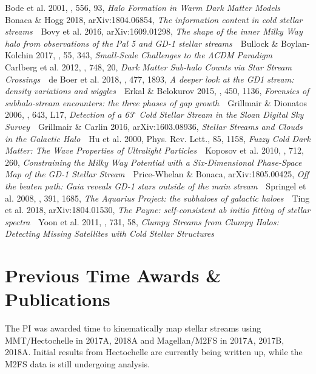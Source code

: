 \documentclass[12pt]{article}
\begin{document}
{Bode et al. 2001, \apj, 556, 93, \emph{Halo Formation in Warm Dark Matter Models} \,\textbullet\,
Bonaca \& Hogg 2018, arXiv:1804.06854, \emph{The information content in cold stellar streams} \,\textbullet\,
Bovy et al. 2016, arXiv:1609.01298, \emph{The shape of the inner Milky Way halo from observations of the Pal 5 and GD-1 stellar streams} \,\textbullet\,
Bullock \& Boylan-Kolchin 2017, \araa, 55, 343, \emph{Small-Scale Challenges to the ΛCDM Paradigm} \,\textbullet\,
Carlberg et al. 2012, \apj, 748, 20, \emph{Dark Matter Sub-halo Counts via Star Stream Crossings} \,\textbullet\,
de Boer et al. 2018, \mnras, 477, 1893, \emph{A deeper look at the GD1 stream: density variations and wiggles} \,\textbullet\,
Erkal \& Belokurov 2015, \mnras, 450, 1136, \emph{Forensics of subhalo-stream encounters: the three phases of gap growth} \,\textbullet\,
Grillmair \& Dionatos 2006, \apj, 643, L17, \emph{Detection of a 63$^\circ$ Cold Stellar Stream in the Sloan Digital Sky Survey} \,\textbullet\,
Grillmair \& Carlin 2016, arXiv:1603.08936, \emph{Stellar Streams and Clouds in the Galactic Halo} \,\textbullet\,
Hu et al. 2000, Phys. Rev. Lett., 85, 1158, \emph{Fuzzy Cold Dark Matter: The Wave Properties of Ultralight Particles} \,\textbullet\,
Koposov et al. 2010, \apj, 712, 260, \emph{Constraining the Milky Way Potential with a Six-Dimensional Phase-Space Map of the GD-1 Stellar Stream} \,\textbullet\,
Price-Whelan \& Bonaca, arXiv:1805.00425, \emph{Off the beaten path: Gaia reveals GD-1 stars outside of the main stream} \,\textbullet\,
Springel et al. 2008, \mnras, 391, 1685, \emph{The Aquarius Project: the subhaloes of galactic haloes} \,\textbullet\,
Ting et al. 2018, arXiv:1804.01530, \emph{The Payne: self-consistent ab initio fitting of stellar spectra} \,\textbullet\,
Yoon et al. 2011, \apj, 731, 58, \emph{Clumpy Streams from Clumpy Halos: Detecting Missing Satellites with Cold Stellar Structures}
}

\section*{Previous Time Awards \& Publications}\vskip-0.2in

The PI was awarded time to kinematically map stellar streams using MMT/Hectochelle in 2017A, 2018A and Magellan/M2FS in 2017A, 2017B, 2018A.
Initial results from Hectochelle are currently being written up, while the M2FS data is still undergoing analysis.

\end{document}
